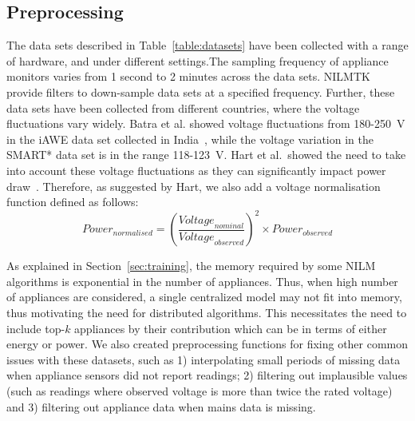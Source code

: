 \documentclass{sig-alternate}
\newcommand{\redcolor}[1]{\textcolor{red}{#1}}
\newcommand{\secref}[1]{Section~\ref{#1}}
\newcommand{\tabref}[1]{Table~\ref{#1}}
\begin{document}
\subsection{Preprocessing}
\label{sec:preprocessing}

\noindent
The data sets described in \tabref{table:datasets} have been collected with a range of hardware, and under different settings.The sampling frequency of appliance monitors varies from 1 second to 2 minutes across the data sets.  NILMTK provide filters to down-sample data sets at a specified frequency. Further, these data sets have been collected from different countries, where the voltage fluctuations vary widely. Batra et al. showed voltage fluctuations from 180-250~V in the iAWE data set collected in India~\cite{iawe}, while the voltage variation in the SMART* data set is in the range 118-123~V. Hart et al.\ showed the need to take into account these voltage fluctuations as they can significantly impact power draw~\cite{hart_1992}. Therefore, as suggested by Hart, we also add a voltage normalisation function defined as follows: 
\begin{equation}
\textit{Power}_{\textit{normalised}} = 
\left(\frac{\textit{Voltage}_{\textit{nominal}}}{\textit{Voltage}_{\textit{observed}}}\right)^2 
\times \textit{Power}_{\textit{observed}}
\end{equation}

As explained in \secref{sec:training}, the memory required by some NILM algorithms is exponential in the number of appliances. Thus, when high number of appliances are considered, a single centralized model may not fit into memory, thus motivating the need for distributed algorithms. This necessitates the need to include top-$k$ appliances by their contribution which can be in terms of either energy or power.  We also created preprocessing functions for fixing other common issues with these datasets, such as 1) interpolating small periods of missing data when appliance sensors did not report readings; 2) filtering out implausible values (such as readings where observed voltage is more than twice the rated voltage) and 3) filtering out appliance data when mains data is missing.
\end{document}
